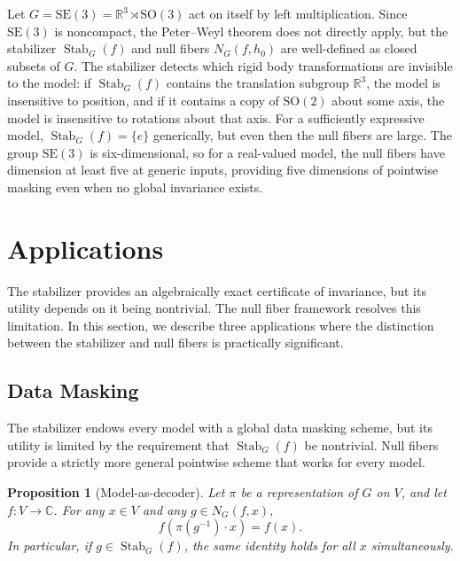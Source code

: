 \documentclass[11pt]{article}
\newtheorem{proposition}[theorem]{Proposition}
\DeclareMathOperator{\Stab}{Stab}
\newcommand{\CC}{\mathbb{C}}
\newcommand{\RR}{\mathbb{R}}
\begin{document}
Let $G = \mathrm{SE}(3) = \RR^3 \rtimes \mathrm{SO}(3)$ act on itself by left multiplication. Since $\mathrm{SE}(3)$ is noncompact, the Peter--Weyl theorem does not directly apply, but the stabilizer $\Stab_G(f)$ and null fibers $N_G(f, h_0)$ are well-defined as closed subsets of $G$. The stabilizer detects which rigid body transformations are invisible to the model: if $\Stab_G(f)$ contains the translation subgroup $\RR^3$, the model is insensitive to position, and if it contains a copy of $\mathrm{SO}(2)$ about some axis, the model is insensitive to rotations about that axis. For a sufficiently expressive model, $\Stab_G(f) = \{e\}$ generically, but even then the null fibers are large. The group $\mathrm{SE}(3)$ is six-dimensional, so for a real-valued model, the null fibers have dimension at least five at generic inputs, providing five dimensions of pointwise masking even when no global invariance exists.

\section{Applications}\label{sec:applications}

The stabilizer provides an algebraically exact certificate of invariance, but its utility depends on it being nontrivial. The null fiber framework resolves this limitation. In this section, we describe three applications where the distinction between the stabilizer and null fibers is practically significant.

\subsection{Data Masking}\label{sec:encryption}

The stabilizer endows every model with a global data masking scheme, but its utility is limited by the requirement that $\Stab_G(f)$ be nontrivial. Null fibers provide a strictly more general pointwise scheme that works for every model.

\begin{proposition}[Model-as-decoder]\label{prop:auto-decrypt}
Let $\pi$ be a representation of $G$ on $V$, and let $f\colon V \to \CC$. For any $x \in V$ and any $g \in N_G(f, x)$,
\begin{equation}
    f(\pi(g^{-1}) \cdot x) = f(x).
\end{equation}
In particular, if $g \in \Stab_G(f)$, the same identity holds for all $x$ simultaneously.
\end{proposition}
\end{document}
